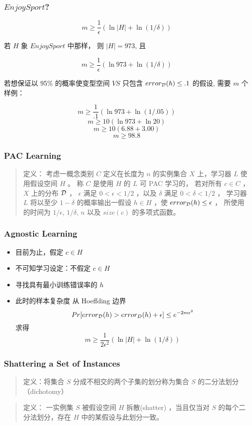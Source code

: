 \documentclass{beamer}
\begin{document}
\begin{frame}
\frametitle{$EnjoySport$?}
\label{sec-4-6}



\[m \geq \frac{1}{\epsilon}(\ln|H| + \ln(1/\delta)) \]


若 $H$ 象 $EnjoySport$ 中那样， 则 $|H| = 973$, 且

$$m \geq \frac{1}{\epsilon}(\ln 973 + \ln(1/\delta))$$


若想保证以 95\% 的概率使变型空间 $VS$ 只包含 $error_{\cal D}(h) \leq .1$ 的假设, 需要 $m$ 个样例：

\[m \geq \frac{1}{.1}(\ln 973 + \ln(1/.05)) \]
\[m \geq 10 (\ln 973 + \ln 20) \]
\[m \geq 10 (6.88 + 3.00) \]
\[m \geq 98.8 \]
\end{frame}
\begin{frame}
\frametitle{PAC Learning}
\label{sec-4-7}


\begin{quote}
定义： 考虑一概念类别 $C$ 定义在长度为 $n$ 的实例集合 $X$ 上，学习器 $L$ 使用假设空间 $H$ 。
称 $C$ 是使用 $H$ 的 $L$ 可 PAC 学习的，
若对所有 $c\in C$ ， $X$ 上的分布 $\cal D$ ， $\epsilon$ 满足 $0<\epsilon<1/2$ ，以及 $\delta$ 满足 $0 < \delta < 1/2$ ，
学习器 $L$ 将以至少 $1-\delta$ 的概率输出一假设 $h\in H$ ，使 $error_{\cal D}(h) \leq \epsilon$ ，
所使用的时间为 $1/\epsilon$, $1/\delta$, $n$ 以及 $size(c)$ 的多项式函数。
\end{quote}
\end{frame}
\begin{frame}
\frametitle{Agnostic Learning}
\label{sec-4-8}


\begin{itemize}
\item 目前为止，假定 $c \in H$
\item 不可知学习设定：不假定 $c \in H$
\item 寻找具有最小训练错误率的 $h$
\item 此时的样本复杂度
   从 Hoeffding 边界
   $$Pr[error_{\cal D}(h) > error_D(h) + \epsilon] \leq e^{-2m\epsilon^{2}}$$
   求得
   $$m \geq \frac{1}{2 \epsilon^{2}}(\ln|H| + \ln(1/\delta))$$
\end{itemize}
\end{frame}
\begin{frame}
\frametitle{Shattering a Set of Instances}
\label{sec-4-9}


\begin{quote}
定义：将集合 $S$ 分成不相交的两个子集的划分称为集合 $S$ 的二分法划分（dichotomy）
\end{quote}

\bigskip

\begin{quote}
定义： 一实例集 $S$ 被假设空间 $H$ 拆散(shatter) ，当且仅当对 $S$ 的每个二分法划分，存在 $H$ 中的某假设与此划分一致。
\end{quote}
\end{frame}
\end{document}
